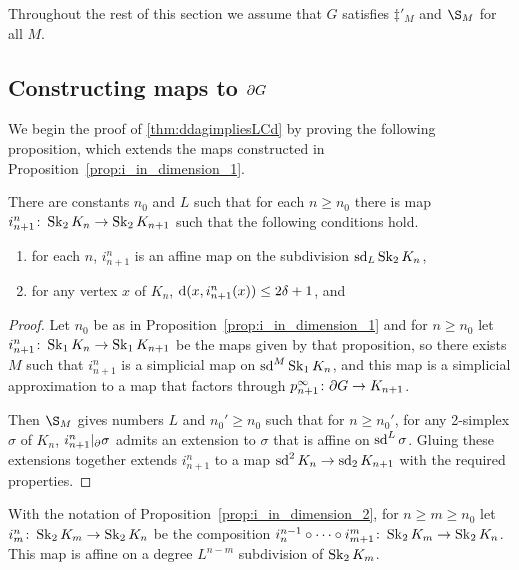 \documentclass[a4paper]{article}
\begin{document}
Throughout the rest of this section we assume that $G$ satisfies
$\ddag'_M$ and $\S_M$ for all $M$.

\subsection{Constructing maps to $\partial G$}

We begin the proof of \cref{thm:ddagimpliesLCd} by proving the following 
proposition, which extends the maps constructed in
Proposition~\ref{prop:i_in_dimension_1}.

\begin{proposition}\label{prop:i_in_dimension_2}
  There are constants $n_0$ and $L$ such that for each $n\geq n_0$ there is map
  $i^n_{n+1}\colon\operatorname{Sk}_2 K_n \to \operatorname{Sk}_2 K_{n+1}$ such that the
  following conditions hold.
  \begin{enumerate}
    \item for each $n$, $i^n_{n+1}$ is an affine map on the subdivision
      $\operatorname{sd}_L\operatorname{Sk}_2 K_n$,
    \item for any vertex $x$ of $K_n$, $\operatorname{d}(x, i^n_{n+1}(x)) \leq 2\delta+1$,
      and
  \end{enumerate}
\end{proposition}

\begin{proof} 
  Let $n_0$ be as in Proposition~\ref{prop:i_in_dimension_1} and for $n \geq
  n_0$ let $i^n_{n+1} \colon \operatorname{Sk}_1 K_n \to \operatorname{Sk}_1 K_{n+1}$ be the maps given
  by that proposition, so there exists $M$ such that $i^n_{n+1}$ is a
  simplicial map on $\operatorname{sd}^M\operatorname{Sk}_1 K_n$, and this map is a simplicial
  approximation to a map that factors through $p^\infty_{n+1} \colon \partial G
  \to K_{n+1}$.

  Then $\S_M$ gives numbers $L$ and $n_0' \geq n_0$ such that for $n \geq
  n_0'$, for any 2-simplex $\sigma$ of $K_n$, $i^n_{n+1}\vert_{\partial}
  \sigma$ admits an extension to $\sigma$ that is affine on $\operatorname{sd}^L\sigma$.
  Gluing these extensions together extends $i^n_{n+1}$ to a map $\operatorname{sd}^2 K_n \to
  \operatorname{sd}_2 K_{n+1}$ with the required properties.
\end{proof}

\begin{definition}
  With the notation of Proposition~\ref{prop:i_in_dimension_2}, for $n \geq m
  \geq n_0$ let $i^n_m \colon \operatorname{Sk}_2 K_m \to \operatorname{Sk}_2 K_n$ be the composition
  $i^{n-1}_n \circ \dotsb \circ i^m_{m+1} \colon \operatorname{Sk}_2 K_m \to 
  \operatorname{Sk}_2 K_n$.  This map is affine on a degree $L^{n-m}$ subdivision of 
  $\operatorname{Sk}_2 K_m$.
\end{definition}
\end{document}
